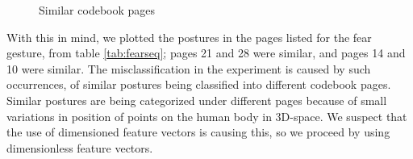 \documentclass[]{report}   %
\begin{document}
\begin{figure}[htbp]
  \centering
  \hfill
  \hfill
  \hfill
  \caption{Similar codebook pages}
  \label{fig:similarcodebook}
\end{figure}

With this in mind, we plotted the postures in the pages listed for the fear gesture, from table \ref{tab:fearseq}; pages 21 and 28 were similar, and pages 14 and 10 were similar. The misclassification in the experiment is caused by such occurrences, of similar postures being classified into different codebook pages. Similar postures are being categorized under different pages because of small variations in position of points on the human body in 3D-space. We suspect that the use of dimensioned feature vectors is causing this, so we proceed by using dimensionless feature vectors.
\end{document}
